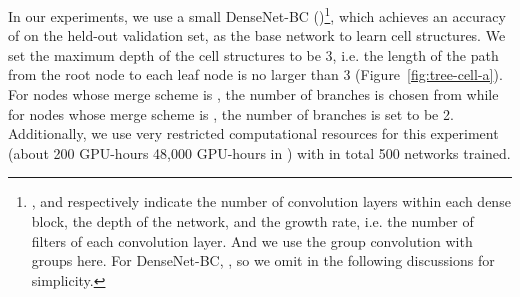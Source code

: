 \documentclass{article}
\makeatletter
\newcommand{\tabincell}[2]{\begin{tabular}{@{}#1@{}}#2\end{tabular}}
\makeatother
\begin{document}

In our experiments, we use a small DenseNet-BC ()\footnote{,  and  respectively indicate the number of  convolution layers within each dense block, the depth of the network, and the growth rate, i.e. the number of filters of each  convolution layer. And we use the group convolution with  groups here.
For DenseNet-BC, , so we omit  in the following discussions for simplicity.}, 
which achieves an accuracy of  on the held-out validation set, as the base network to learn cell structures. We set the maximum depth of the cell structures to be 3, i.e. the length of the path from the root node to each leaf node is no larger than 3 (Figure~\ref{fig:tree-cell-a}). For nodes whose merge scheme is , the number of branches is chosen from  while for nodes whose merge scheme is , the number of branches is set to be 2. Additionally, we use very restricted computational resources for this experiment (about 200 GPU-hours  48,000 GPU-hours in \citet{zoph2017learning}) with in total 500 networks trained. 
\end{document}
